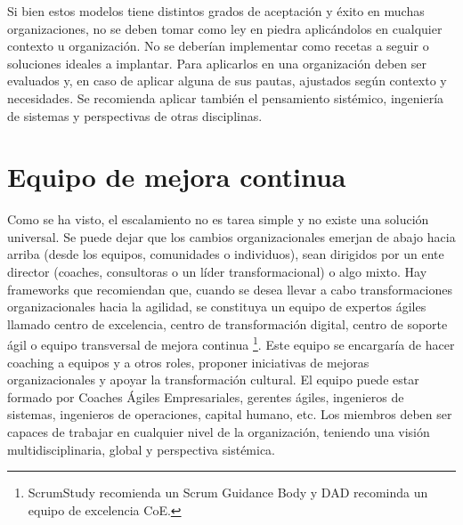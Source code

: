 Si bien estos modelos tiene distintos grados de aceptación y éxito en muchas organizaciones, no se deben tomar como ley en piedra aplicándolos en cualquier contexto u organización. No se deberían implementar como recetas a seguir o soluciones ideales a implantar. Para aplicarlos en una organización deben ser evaluados y, en caso de aplicar alguna de sus pautas, ajustados según contexto y necesidades. Se recomienda aplicar también el pensamiento sistémico, ingeniería de sistemas y perspectivas de otras disciplinas.

\section{Equipo de mejora continua}

Como se ha visto, el escalamiento no es tarea simple y no existe una solución universal. Se puede dejar que los cambios organizacionales emerjan de abajo hacia arriba (desde los equipos, comunidades o individuos), sean dirigidos por un ente director (coaches, consultoras o un líder transformacional) o algo mixto. Hay frameworks que recomiendan que, cuando se desea llevar a cabo transformaciones organizacionales hacia la agilidad, se constituya un equipo de expertos ágiles llamado centro de excelencia, centro de transformación digital, centro de soporte ágil o equipo transversal de mejora continua \footnote{ScrumStudy recomienda un Scrum Guidance Body y DAD recominda un equipo de excelencia CoE.}. Este equipo se encargaría de hacer coaching a equipos y a otros roles, proponer iniciativas de mejoras organizacionales y apoyar la transformación cultural. El equipo puede estar formado por Coaches Ágiles Empresariales, gerentes ágiles, ingenieros de sistemas, ingenieros de operaciones, capital humano, etc. Los miembros deben ser capaces de trabajar en cualquier nivel de la organización, teniendo una visión multidisciplinaria, global y perspectiva sistémica.
